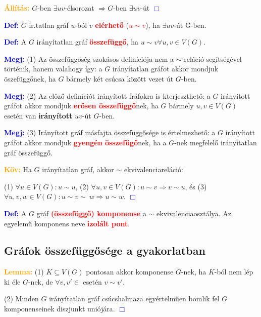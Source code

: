 \documentclass[../szamtud.tex]{subfiles}
\begin{document}
        \textcolor{orange}{\textbf{Állítás:}} $G$-ben $\exists uv$-élsorozat $\Rightarrow G$-ben $\exists uv$-út \textcolor{blue}{$\Box$} 

        \textcolor{blue}{\textbf{Def:}} $G$ ir.tatlan gráf $u$-ból $v$ \textcolor{red}{\textbf{elérhető}} (\textcolor{red}{\textbf{$u \sim v$}}), ha $\exists uv$-út G-ben.

        \textcolor{blue}{\textbf{Def:}} A $G$ irányítatlan gráf \textcolor{red}{\textbf{összefüggő}}, ha $u \sim v \forall u,v \in V(G)$.

        \textcolor{blue}{\textbf{Megj:}} (1) Az összefüggőség szokásos definíciója nem a $\sim$ reláció segítségével történik, hanem valahogy így: a $G$ irányítatlan gráfot akkor mondjuk öszefüggőnek, ha $G$ bármely két csúcsa között vezet út $G$-ben.

        \textcolor{blue}{\textbf{Megj:}} (2) Az előző definíciót irányított fráfokra is kterjeszthető: a $G$ irányított gráfot akkor mondjuk \textcolor{red}{\textbf{erősen összefüggő}}nek, ha $G$ bármely $u,v \in V(G) $ esetén van \textbf{irányított} $uv$-út $G$-ben.

        \textcolor{blue}{\textbf{Megj:}} (3) Irányított gráf másfajta összefüggősége is értelmezhető: a $G$ irányított gráfot akkor mondjuk \textcolor{red}{\textbf{gyengén összefügő}}nek, ha a $G$-nek megfelelő irányítatlan gráf összefüggő.

        \textcolor{orange}{\textbf{Köv:}} Ha $G$ irányítatlan gráf, akkor $\sim$ ekvivalenciareláció:

        (1) $\forall u \in V(G) : u \sim u$, (2) $ \forall u,v \in V(G) : u \sim v \Rightarrow v \sim u$, és (3) $\forall u,v,w \in V(G): u \sim v \sim \ w \Rightarrow u \sim w$. \textcolor{blue}{$\Box$} 

        \textcolor{blue}{\textbf{Def:}} A $G$ gráf \textcolor{red}{\textbf{(összefüggő) komponense}} a $\sim$ ekvivalenciaosztálya. Az egyelemű komponens neve \textcolor{red}{\textbf{izolált pont}}.

    \subsection{Gráfok összefüggősége a gyakorlatban}

        \textcolor{orange}{\textbf{Lemma:}} (1) $K \subseteq V(G)$ pontosan akkor komponense $G$-nek, ha $K$-ból nem lép ki éle $G$-nek, de $\forall v,v' \in$ esetén $v \sim v'$.

        (2) Minden $G$ irányítatlan gráf csúcshalmaza egyértelműen bomlik fel $G$ komponenseinek diszjunkt uniójára. \textcolor{blue}{$\Box$} 
\end{document}
